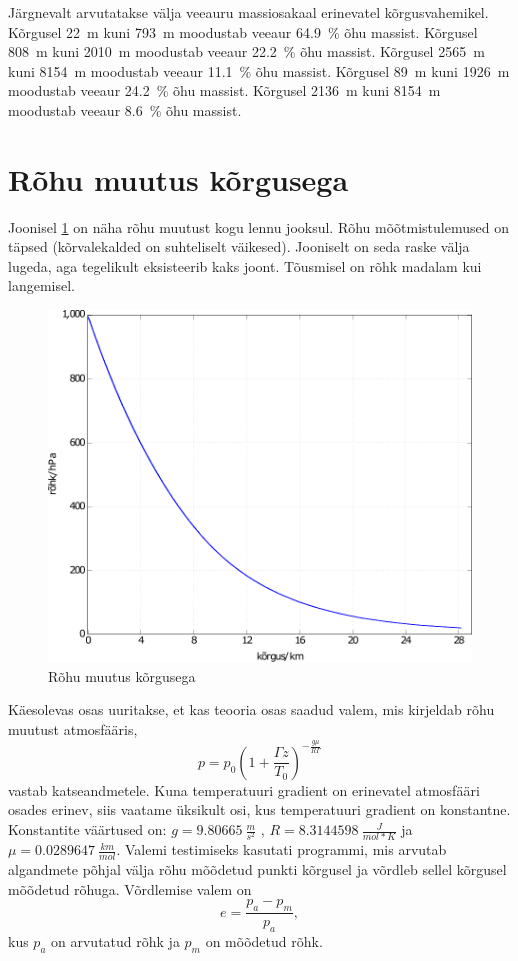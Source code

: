 \documentclass{trkut}%
\begin{document}
Järgnevalt arvutatakse välja veeauru massiosakaal erinevatel kõrgusvahemikel. Kõrgusel \SI{22}{m} kuni \SI{793}{m} moodustab veeaur \SI{64.9}{\percent} õhu massist. Kõrgusel \SI{808}{m} kuni \SI{2010}{m} moodustab veeaur \SI{22.2}{\percent} õhu massist. Kõrgusel \SI{2565}{m} kuni \SI{8154}{m} moodustab veeaur \SI{11.1}{\percent} õhu massist. Kõrgusel \SI{89}{m} kuni \SI{1926}{m} moodustab veeaur \SI{24.2}{\percent} õhu massist. Kõrgusel \SI{2136}{m} kuni \SI{8154}{m} moodustab veeaur \SI{8.6}{\percent} õhu massist.


\section{Rõhu muutus kõrgusega}
Joonisel \ref{prekõrg} on näha rõhu muutust kogu lennu jooksul. Rõhu mõõtmistulemused on täpsed (kõrvalekalded on suhteliselt väikesed). Jooniselt on seda raske välja lugeda, aga tegelikult eksisteerib kaks joont. Tõusmisel on rõhk madalam kui langemisel.
\begin{figure}[h]
	\includegraphics[width=1\textwidth]{PicGra/prekõrg.pdf}
	\caption{Rõhu muutus kõrgusega}
	\label{prekõrg}%
\end{figure}

Käesolevas osas uuritakse, et kas teooria osas saadud valem, mis kirjeldab rõhu muutust atmosfääris,
\begin{equation}\label{eq14}
p = p_0 \left(1+\frac{\Gamma z}{T_0}\right)^{-\frac{g\mu}{R\Gamma}}
\end{equation}
vastab katseandmetele. Kuna temperatuuri gradient on erinevatel atmosfääri osades erinev, siis vaatame üksikult osi, kus temperatuuri gradient on konstantne. Konstantite väärtused on: $g = \SI{9.80665}{\frac{m}{s^2}}$ , $R = \SI{8.3144598}{\frac{J}{mol*K}}$ ja $\mu = \SI{0.0289647}{\frac{km}{mol}}$. Valemi testimiseks kasutati programmi, mis arvutab algandmete põhjal välja rõhu mõõdetud punkti kõrgusel ja võrdleb sellel kõrgusel mõõdetud rõhuga. Võrdlemise valem on
\begin{equation*}
e = \frac{p_a-p_m}{p_a},
\end{equation*}
kus $p_a$ on arvutatud rõhk ja $p_m$ on mõõdetud rõhk.
\end{document}
